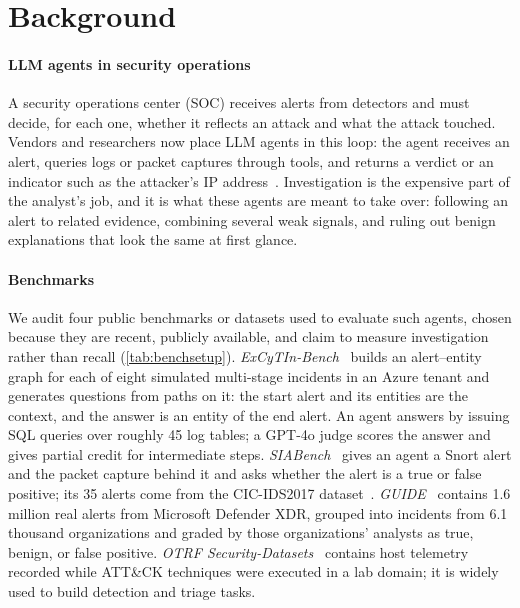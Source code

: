 \section{Background}
\label{sec:background}

\paragraph{LLM agents in security operations} A security operations center (SOC) receives alerts from detectors and must decide, for each one, whether it reflects an attack and what the attack touched. Vendors and researchers now place LLM agents in this loop: the agent receives an alert, queries logs or packet captures through tools, and returns a verdict or an indicator such as the attacker's IP address~\citep{guide,cortex,sentinelrl}. Investigation is the expensive part of the analyst's job, and it is what these agents are meant to take over: following an alert to related evidence, combining several weak signals, and ruling out benign explanations that look the same at first glance.

\paragraph{Benchmarks} We audit four public benchmarks or datasets used to evaluate such agents, chosen because they are recent, publicly available, and claim to measure investigation rather than recall (\cref{tab:benchsetup}).
\emph{ExCyTIn-Bench}~\citep{excytin} builds an alert--entity graph for each of eight simulated multi-stage incidents in an Azure tenant and generates questions from paths on it: the start alert and its entities are the context, and the answer is an entity of the end alert. An agent answers by issuing SQL queries over roughly 45 log tables; a GPT-4o judge scores the answer and gives partial credit for intermediate steps.
\emph{SIABench}~\citep{siabench} gives an agent a Snort alert and the packet capture behind it and asks whether the alert is a true or false positive; its 35 alerts come from the CIC-IDS2017 dataset~\citep{cicids2017}.
\emph{GUIDE}~\citep{guide} contains 1.6 million real alerts from Microsoft Defender XDR, grouped into incidents from 6.1 thousand organizations and graded by those organizations' analysts as true, benign, or false positive.
\emph{OTRF Security-Datasets}~\citep{otrf} contains host telemetry recorded while ATT\&CK techniques were executed in a lab domain; it is widely used to build detection and triage tasks.

